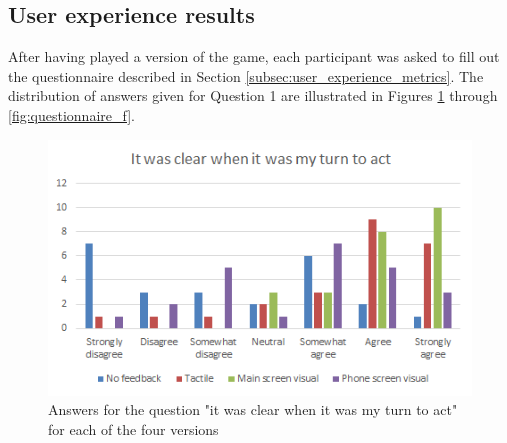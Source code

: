 \subsection{User experience results}
After having played a version of the game, each participant was asked to fill out the questionnaire described in Section \ref{subsec:user_experience_metrics}. The distribution of answers given for Question 1 are illustrated in Figures \ref{fig:questionnaire_a} through \ref{fig:questionnaire_f}.

\begin{figure}[hp!]
	\centering
	\includegraphics[scale=1]{figures/questionnaire_a.png}
	\caption{Answers for the question "it was clear when it was my turn to act" for each of the four versions}\label{fig:questionnaire_a}
\end{figure}



